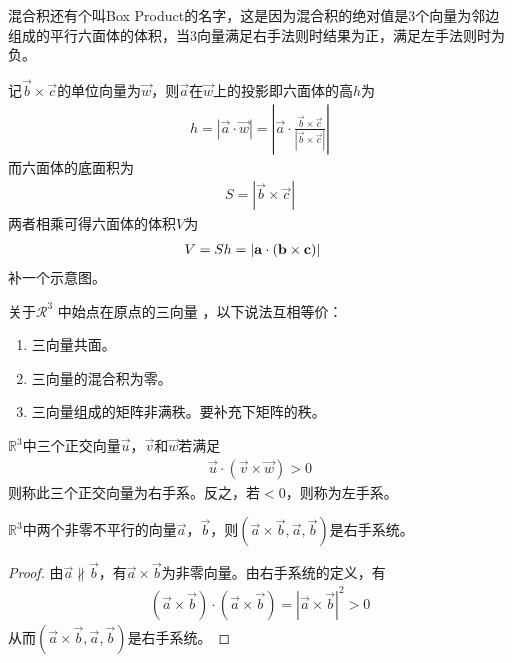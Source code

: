 \begin{example}[混合积的几何意义]
  混合积还有个叫Box Product的名字，这是因为混合积的绝对值是3个向量为邻边组成的平行六面体的体积，当3向量满足右手法则时结果为正，满足左手法则时为负。

  记$\vec b\times \vec c$的单位向量为$\vec w$，则$\vec a$在$\vec w$上的投影即六面体的高$h$为
  \begin{align*}
    h = |\vec a \cdot \vec w| =
    \left|\vec a\cdot \frac{\vec b\times \vec c}{|\vec b\times\vec c|} \right|
  \end{align*}
  而六面体的底面积为
  \begin{align*}
    S = |\vec b\times\vec c|
  \end{align*}
  两者相乘可得六面体的体积$V$为
  \begin{align*}
    V=Sh =|\vec a\cdot(\vec b\times \vec c)| &\qedhere
  \end{align*}
  \color{red}补一个示意图。
\end{example}

\begin{question}
  关于$\mathcal{R}^3$ 中始点在原点的三向量%
  ，以下说法互相等价：
  \begin{enumerate}
  \item 三向量共面。
  \item 三向量的混合积为零。
  \item 三向量组成的矩阵非满秩。\color{red}要补充下矩阵的秩。
  \end{enumerate}
\end{question}

\begin{definition}[右手系]
  $\mathbb{R}^3$中三个正交向量$\vec u$，$\vec v$和$\vec w$若满足
  \begin{align*}
    \vec u \cdot (\vec v\times \vec w) > 0
  \end{align*}
  则称此三个正交向量为右手系。反之，若$<0$，则称为左手系。
\end{definition}

\begin{lemma}
  $\mathbb{R}^3$中两个非零不平行的向量$\vec a$，$\vec b$，则$(\vec a\times \vec b, \vec a, \vec b)$是右手系统。
\end{lemma}
\begin{proof}
  由$\vec a\not\parallel\vec b$，有$\vec a \times \vec b$为非零向量。由右手系统的定义，有
  \begin{align*}
    (\vec a\times \vec b) \cdot (\vec a\times \vec b) = \left| \vec a\times \vec b \right|^2 > 0
  \end{align*}
  从而$(\vec a\times \vec b, \vec a, \vec b)$是右手系统。
\end{proof}

